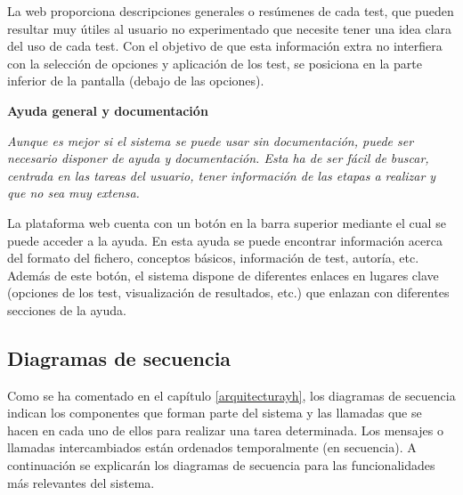 La web proporciona descripciones generales o resúmenes de cada test, que pueden resultar muy útiles al usuario no experimentado que necesite tener una idea clara del uso de cada test. Con el objetivo de que esta información extra no interfiera con la selección de opciones y aplicación de los test, se posiciona en la parte inferior de la pantalla (debajo de las opciones).

\noindent
\textbf{Ayuda general y documentación}

\textit{Aunque es mejor si el sistema se puede usar sin documentación, puede ser necesario disponer de ayuda y documentación. Esta ha de ser fácil de buscar, centrada en las tareas del usuario, tener información de las etapas a realizar y que no sea muy extensa.}

La plataforma web cuenta con un botón en la barra superior mediante el cual se puede acceder a la ayuda. En esta ayuda se puede encontrar información acerca del formato del fichero, conceptos básicos, información de test, autoría, etc. Además de este botón, el sistema dispone de diferentes enlaces en lugares clave (opciones de los test, visualización de resultados, etc.) que enlazan con diferentes secciones de la ayuda.

\subsection{Diagramas de secuencia}
Como se ha comentado en el capítulo \ref{arquitecturayh}, los diagramas de secuencia indican los componentes que forman parte del sistema y las llamadas que se hacen en cada uno de ellos para realizar una tarea determinada. Los mensajes o llamadas intercambiados están ordenados temporalmente (en secuencia). A continuación se explicarán los diagramas de secuencia para las funcionalidades más relevantes del sistema.

